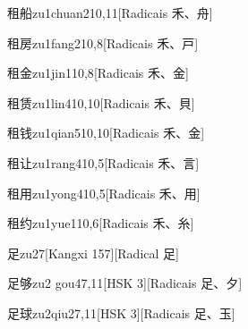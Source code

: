 \begin{entry}{租船}{zu1chuan2}{10,11}[Radicais ⽲、⾈]
\end{entry}

\begin{entry}{租房}{zu1fang2}{10,8}[Radicais ⽲、⼾]
\end{entry}

\begin{entry}{租金}{zu1jin1}{10,8}[Radicais ⽲、⾦]
\end{entry}

\begin{entry}{租赁}{zu1lin4}{10,10}[Radicais ⽲、⾙]
\end{entry}

\begin{entry}{租钱}{zu1qian5}{10,10}[Radicais ⽲、⾦]
\end{entry}

\begin{entry}{租让}{zu1rang4}{10,5}[Radicais ⽲、⾔]
\end{entry}

\begin{entry}{租用}{zu1yong4}{10,5}[Radicais ⽲、⽤]
\end{entry}

\begin{entry}{租约}{zu1yue1}{10,6}[Radicais ⽲、⽷]
\end{entry}

\begin{entry}{足}{zu2}{7}[Kangxi 157][Radical ⾜]
\end{entry}

\begin{entry}{足够}{zu2 gou4}{7,11}[HSK 3][Radicais ⾜、⼣]
\end{entry}

\begin{entry}{足球}{zu2qiu2}{7,11}[HSK 3][Radicais ⾜、⽟]
\end{entry}

